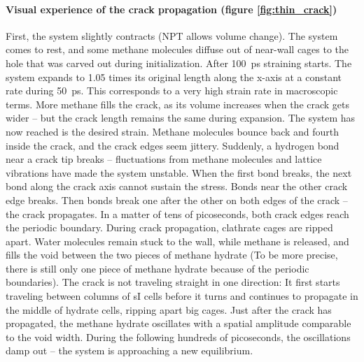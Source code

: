 \begin{framed}
\paragraph{Visual experience of the crack propagation (figure \ref{fig:thin_crack})}
First, the system slightly contracts (NPT allows volume change). The system comes to rest, and some methane molecules diffuse out of near-wall cages to the hole that was carved out during initialization. After \SI{100}{\pico\second} straining starts. The system expands to 1.05 times its original length along the x-axis at a constant rate during \SI{50}{\pico\second}. This corresponds to a very high strain rate in macroscopic terms. More methane fills the crack, as its volume increases when the crack gets wider -- but the crack length remains the same during expansion. The system has now reached is the desired strain. Methane molecules bounce back and fourth inside the crack, and the crack edges seem jittery. Suddenly, a hydrogen bond near a crack tip breaks -- fluctuations from methane molecules and lattice vibrations have made the system unstable. When the first bond breaks, the next bond along the crack axis cannot sustain the stress. Bonds near the other crack edge breaks. Then bonds break one after the other on both edges of the crack -- the crack propagates. In a matter of tens of picoseconds, both crack edges reach the periodic boundary. During crack propagation, clathrate cages are ripped apart. Water molecules remain stuck to the wall, while methane is released, and fills the void between the two pieces of methane hydrate (To be more precise, there is still only one piece of methane hydrate because of the periodic boundaries). The crack is not traveling straight in one direction: It first starts traveling between columns of sI cells before it turns and continues to propagate in the middle of hydrate cells, ripping apart big cages. Just after the crack has propagated, the methane hydrate oscillates with a spatial amplitude comparable to the void width. During the following hundreds of picoseconds, the oscillations damp out -- the system is approaching a new equilibrium.
\end{framed}

